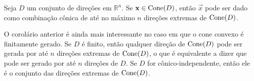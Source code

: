 \begin{cor:caratheodory cones}
  Seja $D$ um conjunto de direções em $\mathbb{R}^n$. Se $\mathbf{x} \in \mathrm{Cone}(D)$, então
  $\vec{x}$ pode ser dado como combinação cônica de até no máximo $n$ direções
  extremas de $\mathrm{Cone}(D)$.
\end{cor:caratheodory cones}

O corolário anterior é ainda mais interessante no caso em que o cone convexo
é finitamente gerado. Se $D$ é finito, então qualquer direção de
$\mathrm{Cone}(D)$ pode ser gerada por até $n$ direções extremas de $\mathrm{Cone}(D)$, o
que é equivalente a dizer que pode ser gerado por até $n$ direções de $D$.
Se $D$ for cônico-independente, então ele é o conjunto das direções
extremas de $\mathrm{Cone}(D)$.

